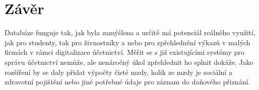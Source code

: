 \documentclass{article}
\begin{document}
	\section{Závěr}
	Databáze funguje tak, jak byla zamýšlena a určitě má potenciál reálného využití, jak pro studenty, tak pro živnostníky a nebo pro zpřehlednění výkazů v malých firmách v rámci digitalizace účetnictví. Měřit se s již existujícími systémy pro správu účetnictví nemůže, ale nenáročný úkol zpřehlednit ho splnit dokáže. Jako rozšíření by se daly přidat výpočty čisté mzdy, kolik ze mzdy je sociální a zdravotní pojištění nebo jiné potřebné údaje pro záznam do daňového přiznání.
	
\end{document}

